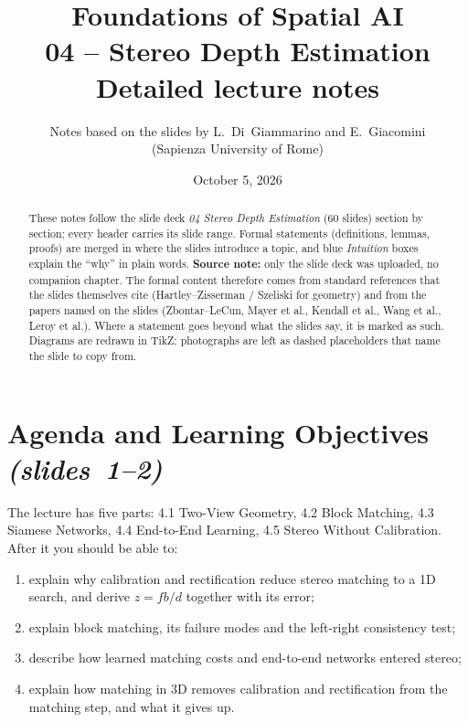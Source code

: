 \documentclass[11pt,a4paper]{article}
\title{\textbf{Foundations of Spatial AI}\\[2pt] \large 04 -- Stereo Depth Estimation\\[2pt] \normalsize Detailed lecture notes}
\author{Notes based on the slides by L.~Di~Giammarino and E.~Giacomini\\(Sapienza University of Rome)}
\date{October 5, 2026}
\newcommand{\slr}[1]{\texorpdfstring{\emph{(slides~#1)}}{(slides #1)}}
\theoremstyle{definition}
\begin{document}
\maketitle

\begin{abstract}\noindent
These notes follow the slide deck \emph{04 Stereo Depth Estimation} (60 slides) section by section; every header carries its slide range. Formal statements (definitions, lemmas, proofs) are merged in where the slides introduce a topic, and blue \emph{Intuition} boxes explain the ``why'' in plain words.
\textbf{Source note:} only the slide deck was uploaded, no companion chapter. The formal content therefore comes from standard references that the slides themselves cite (Hartley--Zisserman / Szeliski for geometry) and from the papers named on the slides (Zbontar--LeCun, Mayer et al., Kendall et al., Wang et al., Leroy et al.). Where a statement goes beyond what the slides say, it is marked as such.
Diagrams are redrawn in TikZ; photographs are left as dashed placeholders that name the slide to copy from.
\end{abstract}

\tableofcontents
\newpage

\section*{Agenda and Learning Objectives \slr{1--2}}
The lecture has five parts: 4.1 Two-View Geometry, 4.2 Block Matching, 4.3 Siamese Networks, 4.4 End-to-End Learning, 4.5 Stereo Without Calibration. After it you should be able to:
\begin{enumerate}
\item explain why calibration and rectification reduce stereo matching to a 1D search, and derive $z=fb/d$ together with its error;
\item explain block matching, its failure modes and the left-right consistency test;
\item describe how learned matching costs and end-to-end networks entered stereo;
\item explain how matching in 3D removes calibration and rectification from the matching step, and what it gives up.
\end{enumerate}

\end{document}
